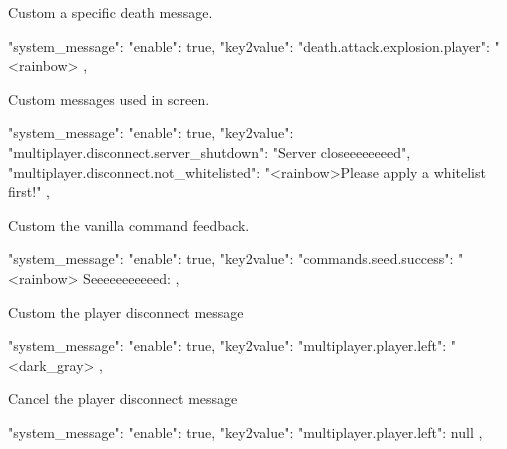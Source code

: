\begin{example}{Custom a specific death message.}
    \begin{json}
        "system_message": {
            "enable": true,
            "key2value": {
                "death.attack.explosion.player": "<rainbow>%
            }
        },
    \end{json}
\end{example}

\begin{example}{Custom messages used in screen.}
    \begin{json}
        "system_message": {
            "enable": true,
            "key2value": {
                "multiplayer.disconnect.server_shutdown": "Server closeeeeeeeed",
                "multiplayer.disconnect.not_whitelisted": "<rainbow>Please apply a whitelist first!"
            }
        },
    \end{json}
\end{example}

\begin{example}{Custom the vanilla command feedback.}
    \begin{json}
        "system_message": {
            "enable": true,
            "key2value": {
                "commands.seed.success": "<rainbow> Seeeeeeeeeeed: %
            }
        },
    \end{json}
\end{example}

\begin{example}{Custom the player disconnect message}
    \begin{json}
        "system_message": {
            "enable": true,
            "key2value": {
                "multiplayer.player.left": "<dark_gray>%
            }
        },
    \end{json}
\end{example}

\begin{example}{Cancel the player disconnect message}
    \begin{json}
        "system_message": {
            "enable": true,
            "key2value": {
                "multiplayer.player.left": null
            }
        },
    \end{json}
\end{example}
